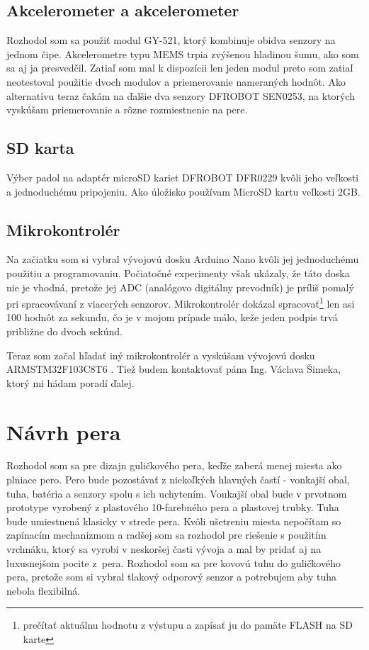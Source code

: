 \subsection*{Akcelerometer a akcelerometer}

Rozhodol som sa použiť modul GY-521, ktorý kombinuje obidva senzory na jednom čipe. Akcelerometre typu MEMS trpia zvýšenou hladinou šumu\cite{PawlusJan2019Zpns}, ako som sa aj ja presvedčil. Zatiaľ som mal k dispozícii len jeden modul preto som zatiaľ neotestoval použitie dvoch modulov a priemerovanie nameraných hodnôt. Ako alternatívu teraz čakám na ďalšie dva senzory DFROBOT SEN0253\cite{PohybovySenzor}, na ktorých vyskúšam priemerovanie a rôzne rozmiestnenie na pere.

\subsection*{SD karta}

Výber padol na adaptér microSD kariet DFROBOT DFR0229 kvôli jeho veľkosti a jednoduchému pripojeniu. Ako úložisko používam MicroSD kartu veľkosti 2GB. 

\subsection*{Mikrokontrolér}

Na začiatku som si vybral vývojovú dosku Arduino Nano kvôli jej jednoduchému použitiu a programovaniu. 
Počiatočné experimenty však ukázaly, že táto doska nie je vhodná, pretože jej ADC (analógovo digitálny prevodník) je príliš pomalý pri spracovávaní z viacerých senzorov. Mikrokontrolér dokázal spracovať\footnote{prečítať aktuálnu hodnotu z výstupu a zapísať ju do pamäte FLASH na SD karte} len asi 100 hodnôt za sekundu, čo je v mojom prípade málo, keže jeden podpis trvá približne do dvoch sekúnd.

Teraz som začal hľadať iný mikrokontrolér a vyskúšam vývojovú dosku ARMSTM32F103C8T6 \cite{ArduinoARM}. Tiež budem kontaktovať pána Ing. Václava Šimeka, ktorý mi hádam poradí ďalej.


\section{Návrh pera}

Rozhodol som sa pre dizajn guličkového pera, keďže zaberá menej miesta ako plniace pero. Pero bude pozostávať z niekoľkých hlavných častí - vonkajší obal, tuha, batéria a senzory spolu s ich uchytením. Vonkajší obal bude v prvotnom prototype vyrobený z plastového 10-farebného pera a plastovej trubky. Tuha bude umiestnená klasicky v strede pera. Kvôli ušetreniu miesta nepočítam so zapínacím mechanizmom a radšej som sa rozhodol pre riešenie s použitím vrchnáku, ktorý sa vyrobí v neskoršej časti vývoja a mal by pridať aj na luxusnejšom pocite z~pera. Rozhodol som sa pre kovovú tuhu do guličkového pera, pretože som si vybral tlakový odporový senzor a potrebujem aby tuha nebola flexibilná. 

